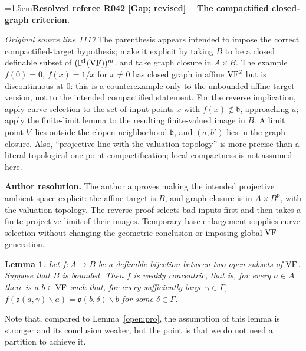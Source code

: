 \documentclass[12pt]{amsart}
\newcommand{\ResolvedRefereeRemark}[5]{%
  \par\medskip\begingroup\normalfont\small\color{gray}%
  \emergencystretch=1.5em\noindent\textbf{Resolved referee R#1 [#2] -- #3.}\par\nobreak\noindent #4\par
  \medskip\color{ResolutionGreen}\noindent\textbf{Author resolution.} #5\par
  \endgroup\medskip
}
\theoremstyle{plain}
\newtheorem{lem}[thm]{Lemma}
\theoremstyle{definition}
\theoremstyle{remark}
\numberwithin{equation}{section}
\theoremstyle{plain}
\newcommand{\VF}{\textup{VF}}
\newcommand{\gb}{\mathfrak{b}}
\newcommand{\go}{\mathfrak{o}}
\newcommand{\0}{\emptyset}
\newcommand{\fun}{\longrightarrow}
\newcommand{\mi}{\smallsetminus}
\begin{document}
\ResolvedRefereeRemark{042}{Gap; revised}{The compactified closed-graph criterion}{%
\textit{Original source line 1117.}\quad The parenthesis appears intended to impose the correct compactified-target hypothesis; make it explicit by taking $B$ to be a closed definable subset of $(\mathbb P^1(\VF))^m$, and take graph closure in $A\times B$. The example $f(0)=0$, $f(x)=1/x$ for $x\ne0$ has closed graph in affine $\VF^2$ but is discontinuous at $0$: this is a counterexample only to the unbounded affine-target version, not to the intended compactified statement. For the reverse implication, apply curve selection to the set of input points $x$ with $f(x)\notin\gb$, approaching $a$; apply the finite-limit lemma to the resulting finite-valued image in $B$. A limit point $b'$ lies outside the clopen neighborhood $\gb$, and $(a,b')$ lies in the graph closure. Also, ``projective line with the valuation topology'' is more precise than a literal topological one-point compactification; local compactness is not assumed here.
}{The author approves making the intended projective ambient space explicit: the affine target is $B$, and graph closure is in $A\times B^{\mathrm p}$, with the valuation topology. The reverse proof selects bad inputs first and then takes a finite projective limit of their images. Temporary base enlargement supplies curve selection without changing the geometric conclusion or imposing global $\VF$-generation.}


\begin{lem}\label{lim:weak}
Let $f : A  \fun B$ be a definable bijection between two open subsets of $\VF$. Suppose that $B$ is bounded. Then $f$ is weakly concentric, that is, for every $a \in A$ there is a $b \in \VF$ such that, for every sufficiently large $\gamma \in \Gamma$, $f(\go(a, \gamma) \mi a) = \go(b, \delta) \mi b$ for some $\delta \in \Gamma$.
\end{lem}

Note that, compared to Lemma~\ref{open:pro}, the assumption of this lemma is stronger and its conclusion weaker, but the point is that we do not need a partition to achieve it.
\end{document}
